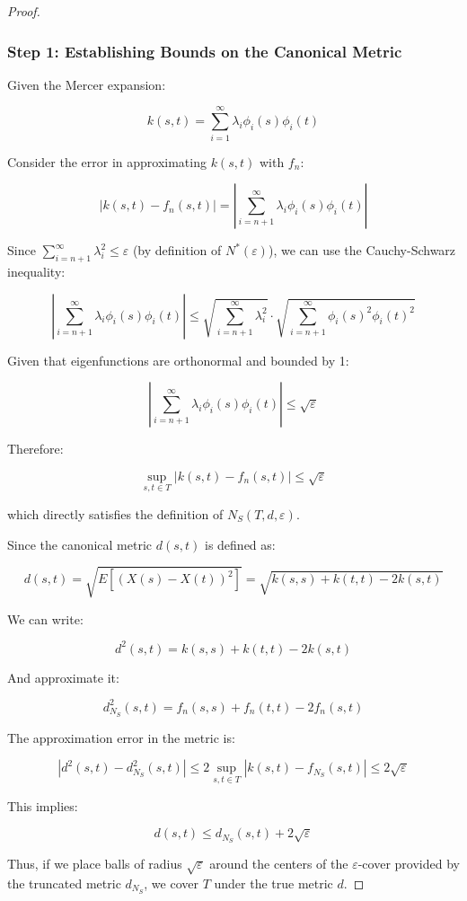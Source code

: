 \begin{proof}

\subsubsection*{Step 1: Establishing Bounds on the Canonical Metric}

Given the Mercer expansion:

\[k(s,t) = \sum_{i=1}^{\infty} \lambda_i \phi_i(s) \phi_i(t)\]

Consider the error in approximating $k(s,t)$ with $f_n$:

\[|k(s,t) - f_n(s,t)| = \left|\sum_{i=n+1}^{\infty} \lambda_i \phi_i(s) \phi_i(t)\right|\]

Since $\sum_{i=n+1}^{\infty} \lambda_i^2 \leq \varepsilon$ (by definition of $N^*(ε)$), we can use the Cauchy-Schwarz inequality:

\[\left|\sum_{i=n+1}^{\infty} \lambda_i \phi_i(s) \phi_i(t)\right| \leq \sqrt{\sum_{i=n+1}^{\infty} \lambda_i^2} \cdot \sqrt{\sum_{i=n+1}^{\infty} \phi_i(s)^2 \phi_i(t)^2}\]

Given that eigenfunctions are orthonormal and bounded by 1:

\[\left|\sum_{i=n+1}^{\infty} \lambda_i \phi_i(s) \phi_i(t)\right| \leq \sqrt{\varepsilon}\]

Therefore:

\[\sup_{s,t \in T} |k(s,t) - f_n(s,t)| \leq \sqrt{\varepsilon}\]

which directly satisfies the definition of $N_S(T,d,\varepsilon)$.

Since the canonical metric $d(s,t)$ is defined as:

\[d(s,t) = \sqrt{E[(X(s) - X(t))^2]} = \sqrt{k(s,s) + k(t,t) - 2k(s,t)}\]

We can write:

\[d^2(s,t) = k(s,s) + k(t,t) - 2k(s,t)\]

And approximate it:

\[d^2_{N_S}(s,t) = f_n(s,s) + f_n(t,t) - 2f_n(s,t)\]

The approximation error in the metric is:

\[|d^2(s,t) - d^2_{N_S}(s,t)| \leq 2 \sup_{s,t \in T} |k(s,t) - f_{N_S}(s,t)| \leq 2\sqrt{\varepsilon}\]

This implies:

\[d(s,t) \leq d_{N_S}(s,t) + 2\sqrt{\varepsilon}\]

Thus, if we place balls of radius $\sqrt{\varepsilon}$ around the centers of the $\varepsilon$-cover provided by the truncated metric $d_{N_S}$, we cover $T$ under the true metric $d$.


\end{proof}
